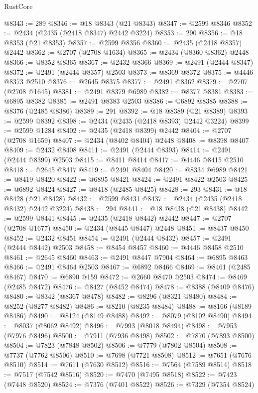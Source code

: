 \begin{lexlean}{RustCore}
\begin{coremodule}
@8343 := 289
@8346 := @18 @8343 (@21 @8343)
@8347 := @2599 @8346
@8352 := @2434 (@2435 (@2418 @8347) @2442 @3224)
@8353 := 290
@8356 := @18 @8353 (@21 @8353)
@8357 := @2599 @8356
@8360 := @2435 (@2418 @8357) @2442
@8362 := @2707 (@2708 @1634)
@8365 := @2434 (@8360 @8362) @2448
@8366 := @8352 @8365
@8367 := @2432 @8366
@8369 := @2491 (@2444 @8347)
@8372 := @2491 (@2444 @8357) @2503
@8373 := @8369 @8372
@8375 := @4446 @8373 @2510
@8376 := @2645 @8375
@8377 := @2491 @8362
@8379 := @2707 (@2708 @1645)
@8381 := @2491 @8379 @6989
@8382 := @8377 @8381
@8383 := @6895 @8382
@8385 := @2491 @8383 @2503
@8386 := @6892 @8385
@8388 := @8376 (@2485 @8386)
@8389 := 291
@8392 := @18 @8389 (@21 @8389)
@8393 := @2599 @8392
@8398 := @2434 (@2435 (@2418 @8393) @2442 @3224)
@8399 := @2599 @1284
@8402 := @2435 (@2418 @8399) @2442
@8404 := @2707 (@2708 @1659)
@8407 := @2434 (@8402 @8404) @2448
@8408 := @8398 @8407
@8409 := @2432 @8408
@8411 := @2491 (@2444 @8393)
@8414 := @2491 (@2444 @8399) @2503
@8415 := @8411 @8414
@8417 := @4446 @8415 @2510
@8418 := @2645 @8417
@8419 := @2491 @8404
@8420 := @8334 @6989
@8421 := @8419 @8420
@8422 := @6895 @8421
@8424 := @2491 @8422 @2503
@8425 := @6892 @8424
@8427 := @8418 (@2485 @8425)
@8428 := 293
@8431 := @18 @8428 (@21 @8428)
@8432 := @2599 @8431
@8437 := @2434 (@2435 (@2418 @8432) @2442 @3224)
@8438 := 294
@8441 := @18 @8438 (@21 @8438)
@8442 := @2599 @8441
@8445 := @2435 (@2418 @8442) @2442
@8447 := @2707 (@2708 @1677)
@8450 := @2434 (@8445 @8447) @2448
@8451 := @8437 @8450
@8452 := @2432 @8451
@8454 := @2491 (@2444 @8432)
@8457 := @2491 (@2444 @8442) @2503
@8458 := @8454 @8457
@8460 := @4446 @8458 @2510
@8461 := @2645 @8460
@8463 := @2491 @8447 @7904
@8464 := @6895 @8463
@8466 := @2491 @8464 @2503
@8467 := @6892 @8466
@8469 := @8461 (@2485 @8467)
@8470 := @6890 @159
@8472 := @2660 @8470 @2503
@8474 := @8469 (@2485 @8472)
@8476 := @8427 (@8452 @8474)
@8478 := @8388 (@8409 @8476)
@8480 := @8342 (@8367 @8478)
@8482 := @8296 (@8321 @8480)
@8484 := @8252 (@8277 @8482)
@8486 := @8210 (@8235 @8484)
@8488 := @8166 (@8189 @8486)
@8490 := @8124 (@8149 @8488)
@8492 := @8079 (@8102 @8490)
@8494 := @8037 (@8062 @8492)
@8496 := @7993 (@8018 @8494)
@8498 := @7953 (@7976 @8496)
@8500 := @7911 (@7936 @8498)
@8502 := @7870 (@7893 @8500)
@8504 := @7823 (@7848 @8502)
@8506 := @7779 (@7802 @8504)
@8508 := @7737 (@7762 @8506)
@8510 := @7698 (@7721 @8508)
@8512 := @7651 (@7676 @8510)
@8514 := @7611 (@7630 @8512)
@8516 := @7564 (@7589 @8514)
@8518 := @7517 (@7542 @8516)
@8520 := @7470 (@7495 @8518)
@8522 := @7423 (@7448 @8520)
@8524 := @7376 (@7401 @8522)
@8526 := @7329 (@7354 @8524)

\end{coremodule}
\end{lexlean}
